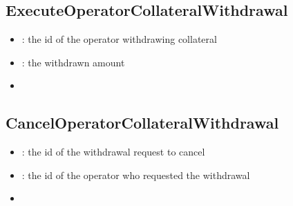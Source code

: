 \documentclass[a4paper,10pt,english]{sphinxmanual}
\begin{document}
\subsection{ExecuteOperatorCollateralWithdrawal}
\label{\detokenize{spec/nomination:executeoperatorcollateralwithdrawal}}


\begin{itemize}
\item {} 
: the id of the operator withdrawing collateral

\item {} 
: the withdrawn amount

\end{itemize}

\begin{itemize}
\item {} 
{\hyperref[\detokenize{spec/nomination:executeoperatorwithdrawal}]{}}

\end{itemize}


\subsection{CancelOperatorCollateralWithdrawal}
\label{\detokenize{spec/nomination:canceloperatorcollateralwithdrawal}}


\begin{itemize}
\item {} 
: the id of the withdrawal request to cancel

\item {} 
: the id of the operator who requested the withdrawal

\end{itemize}

\begin{itemize}
\item {} 
{\hyperref[\detokenize{spec/nomination:canceloperatorwithdrawal}]{}}

\end{itemize}
\end{document}
